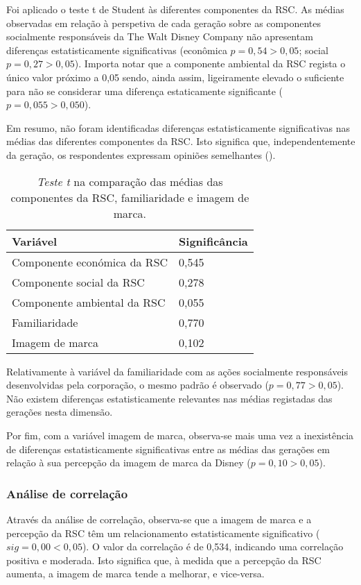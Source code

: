 \documentclass[portuguese]{textolivre}
\begin{document}
Foi aplicado o teste t de Student às diferentes componentes da RSC. As médias observadas em relação à perspetiva de cada geração sobre as componentes socialmente responsáveis da The Walt Disney Company não apresentam diferenças estatisticamente significativas (econômica $p=0,54>0,05$; social $p=0,27>0,05$). Importa notar que a componente ambiental da RSC regista o único valor próximo a 0,05 sendo, ainda assim, ligeiramente elevado o suficiente para não se considerar uma diferença estaticamente significante ($p=0,055>0,050$).

Em resumo, não foram identificadas diferenças estatisticamente significativas nas médias das diferentes componentes da RSC. Isto significa que, independentemente da geração, os respondentes expressam opiniões semelhantes ().  

\begin{table}[h!]
\centering
\begin{threeparttable}
\caption{\textit{Teste t} na comparação das médias das componentes da RSC, familiaridade e imagem de marca.}
\label{tab05}
\begin{tabular}{ll}
\toprule
\textbf{Variável} & \textbf{Significância} \\
 \midrule
Componente económica da RSC & 0,545 \\
Componente social da RSC & 0,278 \\
Componente ambiental da RSC & 0,055 \\
Familiaridade & 0,770 \\
Imagem de marca & 0,102 \\
\bottomrule
\end{tabular}
\end{threeparttable}
\end{table}

Relativamente à variável da familiaridade com as ações socialmente responsáveis desenvolvidas pela corporação, o mesmo padrão é observado ($p=0,77>0,05$). Não existem diferenças estatisticamente relevantes nas médias registadas das gerações nesta dimensão. 

Por fim, com a variável imagem de marca, observa-se mais uma vez a inexistência de diferenças estatisticamente significativas entre as médias das gerações em relação à sua percepção da imagem de marca da Disney ($p=0,10>0,05$). 

\subsubsection{Análise de correlação}
Através da análise de correlação, observa-se que a imagem de marca e a percepção da RSC têm um relacionamento estatisticamente significativo ($sig=0,00<0,05$). O valor da correlação é de 0,534, indicando uma correlação positiva e moderada. Isto significa que, à medida que a percepção da RSC aumenta, a imagem de marca tende a melhorar, e vice-versa. 
\end{document}

